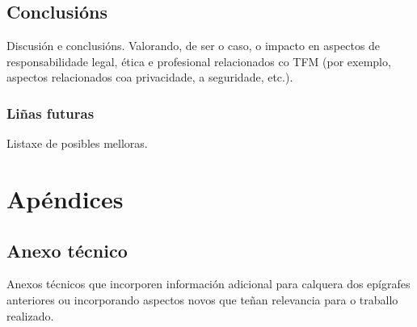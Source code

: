 \documentclass[%
    paper=A4,               %
    twoside,                %
    parskip=full,           %
    12pt,                   %
    titlepage=on,           %
    captions=tableabove,    %
]{book}                     %
\begin{document}
\chapter{Conclusións}
Discusión e conclusións. Valorando, de ser o caso, o impacto en
aspectos de responsabilidade legal, ética e profesional relacionados
co TFM (por exemplo, aspectos relacionados coa privacidade, a
seguridade, etc.).

\section{Liñas futuras}
Listaxe de posibles melloras.

\part*{Apéndices}
\appendix

\chapter{Anexo técnico}
Anexos técnicos que incorporen información adicional para calquera dos
epígrafes anteriores ou incorporando aspectos novos que teñan
relevancia para o traballo realizado.

 

\end{document}
